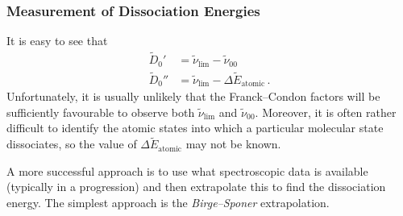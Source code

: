 \documentclass{article}
\theoremstyle{plain}\theoremheaderfont{\normalfont\itshape}\theorembodyfont{\rmfamily}\theoremseparator{.}\newtheorem*{rem}{Remark}\newtheorem*{ex}{Example}\newtheorem*{proof}{Proof}\newtheorem*{altp}{Alternative proof}
\theoremstyle{plain}\theoremheaderfont{\normalfont\bfseries}\theorembodyfont{\rmfamily}\theoremseparator{.}\newtheorem{thm}{Theorem}[section]\newtheorem{lem}[thm]{Lemma}\newtheorem{prop}[thm]{Proposition}\newtheorem*{cor}{Corollary}\newtheorem{defn}[thm]{Definition}\newtheorem{clm}[thm]{Claim}\newtheorem{clminproof}{Claim}\newtheorem{pos}{Postulate}[section]
\theoremstyle{break}\theoremheaderfont{\normalfont\itshape}\theorembodyfont{\rmfamily}\theoremseparator{.\medskip}\newtheorem*{proofskip}{Proof}\newtheorem*{exs}{Examples}\newtheorem*{rems}{Remarks}
\theoremstyle{break}\theoremheaderfont{\normalfont\bfseries}\theorembodyfont{\rmfamily}\theoremseparator{.\medskip}\newtheorem{lemskip}[thm]{Lemma}\newtheorem{defnskip}[thm]{Definition}\newtheorem{propskip}[thm]{Proposition}\newtheorem{thmskip}[thm]{Theorem}
\numberwithin{equation}{section}
\begin{document}
    \subsubsection{Measurement of Dissociation Energies}
    It is easy to see that
    \begin{align}
        \tilde{D}_0'&=\tilde{\nu}_{\text{lim}}-\tilde{\nu}_{00}\\
        \tilde{D}_0''&=\tilde{\nu}_{\text{lim}}-\Delta\tilde{E}_{\text{atomic}}\,.
    \end{align}
    Unfortunately, it is usually unlikely that the Franck--Condon factors will be sufficiently favourable to observe both \(\tilde{\nu}_{\text{lim}}\) and \(\tilde{\nu}_{00}\). Moreover, it is often rather difficult to identify the atomic states into which a particular molecular state dissociates, so the value of \(\Delta\tilde{E}_{\text{atomic}}\) may not be known.

    A more successful approach is to use what spectroscopic data is available (typically in a progression) and then extrapolate this to find the dissociation energy. The simplest approach is the \textit{Birge--Sponer} extrapolation.
\end{document}
